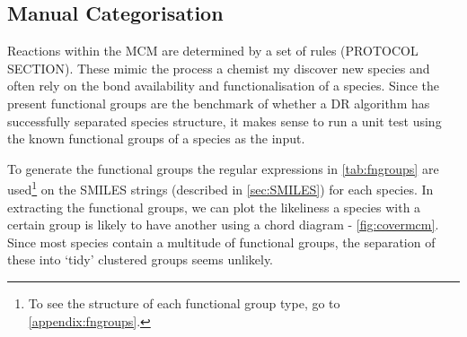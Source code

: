 \subsection{Manual Categorisation}
Reactions within the MCM are determined by a set of rules (PROTOCOL SECTION). These mimic the process a chemist my discover new species and often rely on the bond availability and functionalisation of a species. Since the present functional groups are the benchmark of whether a DR algorithm has successfully separated species structure, it makes sense to run a unit test using the known functional groups of a species as the input.

To generate the functional groups the regular expressions in \autoref{tab:fngroups} are used\footnote{To see the structure of each functional group type, go to \autoref{appendix:fngroups}.} on the SMILES strings (described in \autoref{sec:SMILES}) for each species. In extracting the functional groups, we can plot the likeliness a species with a certain group is likely to have another using a chord diagram - \autoref{fig:covermcm}. Since most species contain a multitude of functional groups, the separation of these into `tidy' clustered groups seems unlikely.


%



